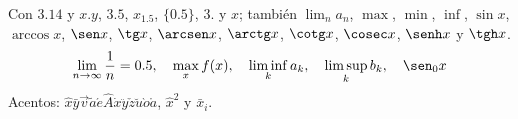\documentclass{article}
\begin{document}
Con $3.14$ y $x. y$, $3 . 5$, $x_{1.5}$, $\{0.5\}$, $3.$ y $\left. x \right.$; también
$\lim_{n} a_n$, $\max$, $\min$, $\inf$, $\sin x$, $\arccos x$, $\sen x$, $\tg x$, $\arcsen x$, $\arctg x$, $\cotg x$,
$\cosec x$, $\senh x$ y $\tgh x$.
\[ \lim_{n\to\infty} \frac{1}{n} = 0.5, \quad \max_{x} f(x), \quad \liminf_{k} a_k, \quad \limsup_{k} b_k, \quad \sen_{0} x \]
Acentos: $\hat{x}\bar{y}\vec{v}\tilde{a}\acute{e}\hat{A}\dot{x}\ddot{y}\check{z}\breve{u}\grave{o}\mathring{a}$, $\hat{x}^2$ y $\bar{x}_i$.
\end{document}
